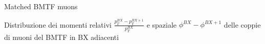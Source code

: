 \documentclass{beamer}
\begin{document}
\begin{frame}{Matched BMTF muons}

Distribuzione dei momenti relativi $\frac{p_T^{BX} - p_T^{BX+1}}{p_T^{BX}}$ e spaziale $\phi^{BX} - \phi^{BX+1}$ delle coppie di muoni del BMTF in BX adiacenti

\vspace{0.8cm}

\begin{columns}

    \begin{column}{0.5\textwidth}
    \end{column}
    \begin{column}{0.5\textwidth}
        
    \end{column}
\end{columns}
    
\end{frame}



    
    
\end{document}
